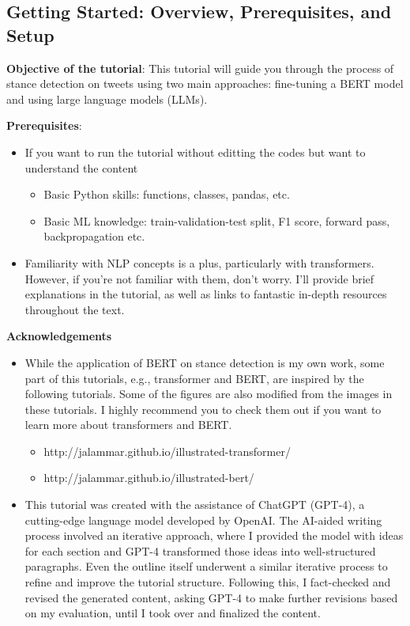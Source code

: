 \documentclass[11pt]{article}
\providecommand{\tightlist}{%
      \setlength{\itemsep}{0pt}\setlength{\parskip}{0pt}}
\begin{document}
    \hypertarget{getting-started-overview-prerequisites-and-setup}{%
\subsection{Getting Started: Overview, Prerequisites, and
Setup}\label{getting-started-overview-prerequisites-and-setup}}

\textbf{Objective of the tutorial}: This tutorial will guide you through
the process of stance detection on tweets using two main approaches:
fine-tuning a BERT model and using large language models (LLMs).

\textbf{Prerequisites}:

\begin{itemize}
\tightlist
\item
  If you want to run the tutorial without editting the codes but want to
  understand the content

  \begin{itemize}
  \tightlist
  \item
    Basic Python skills: functions, classes, pandas, etc.
  \item
    Basic ML knowledge: train-validation-test split, F1 score, forward
    pass, backpropagation etc.
  \end{itemize}
\item
  Familiarity with NLP concepts is a plus, particularly with
  transformers. However, if you're not familiar with them, don't worry.
  I'll provide brief explanations in the tutorial, as well as links to
  fantastic in-depth resources throughout the text.
\end{itemize}

    \textbf{Acknowledgements}

\begin{itemize}
\tightlist
\item
  While the application of BERT on stance detection is my own work, some
  part of this tutorials, e.g., transformer and BERT, are inspired by
  the following tutorials. Some of the figures are also modified from
  the images in these tutorials. I highly recommend you to check them
  out if you want to learn more about transformers and BERT.

  \begin{itemize}
  \tightlist
  \item
    http://jalammar.github.io/illustrated-transformer/
  \item
    http://jalammar.github.io/illustrated-bert/
  \end{itemize}
\item
  This tutorial was created with the assistance of ChatGPT (GPT-4), a
  cutting-edge language model developed by OpenAI. The AI-aided writing
  process involved an iterative approach, where I provided the model
  with ideas for each section and GPT-4 transformed those ideas into
  well-structured paragraphs. Even the outline itself underwent a
  similar iterative process to refine and improve the tutorial
  structure. Following this, I fact-checked and revised the generated
  content, asking GPT-4 to make further revisions based on my
  evaluation, until I took over and finalized the content.
\end{itemize}
\end{document}
